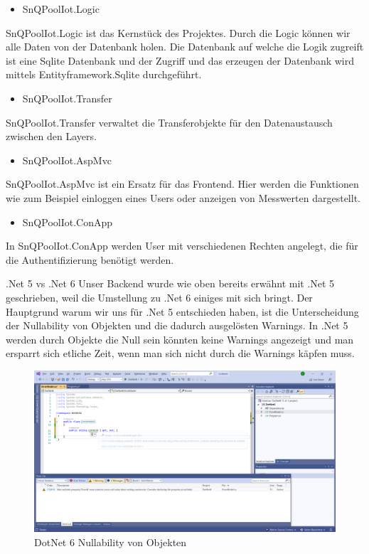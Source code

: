 \begin{itemize}
    \item SnQPoolIot.Logic
\end{itemize}

SnQPoolIot.Logic ist das Kernstück des Projektes. 
Durch die Logic können wir alle Daten von der Datenbank holen. 
Die Datenbank auf welche die Logik zugreift ist eine Sqlite Datenbank und der Zugriff und das erzeugen der Datenbank wird mittels Entityframework.Sqlite durchgeführt.

\begin{itemize}
    \item SnQPoolIot.Transfer
\end{itemize}

SnQPoolIot.Transfer verwaltet die Transferobjekte für den Datenaustausch zwischen den Layers.

\begin{itemize}
    \item SnQPoolIot.AspMvc
\end{itemize}

SnQPoolIot.AspMvc ist ein Ersatz für das Frontend.
Hier werden die Funktionen wie zum Beispiel einloggen eines Users oder anzeigen von Messwerten dargestellt.

\begin{itemize}
    \item SnQPoolIot.ConApp
\end{itemize}

In SnQPoolIot.ConApp werden User mit verschiedenen Rechten angelegt, die für die Authentifizierung benötigt werden.

.Net 5 vs .Net 6
Unser Backend wurde wie oben bereits erwähnt mit .Net 5 geschrieben, weil die Umstellung zu .Net 6 einiges mit sich bringt.
Der Hauptgrund warum wir uns für .Net 5 entschieden haben, ist die Unterscheidung der Nullability von Objekten und die dadurch ausgelösten Warnings.
In .Net 5 werden durch Objekte die Null sein könnten keine Warnings angezeigt und man ersparrt sich etliche Zeit, wenn man sich nicht durch die Warnings käpfen muss.

\begin{figure}[H]
    \centering
    \includegraphics[width=1\textwidth]{pics/DotNet6Nullability.png}
    \caption{DotNet 6 Nullability von Objekten}
\end{figure}


